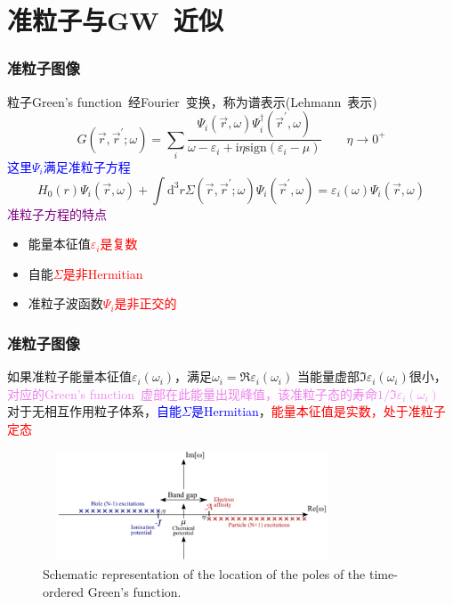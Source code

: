 \documentclass[cjk,slidestop,compress,mathserif,blue]{beamer}
\begin{document}
\section{准粒子与\rm{GW~}近似}
\frame
{
	\frametitle{准粒子图像}
	粒子\textrm{Green's function~}经\textrm{Fourier~}变换，称为谱表示(\textrm{Lehmann~}表示)
	\begin{displaymath}
		G(\vec r,\vec r^{\prime};\omega)=\sum_i\frac{\Psi_i(\vec r,\omega)\Psi_i^{\dag}(\vec r^{\prime},\omega)}{\omega-\varepsilon_i+\mathrm{i}\eta\mathrm{sign}(\varepsilon_i-\mu)}\qquad\eta\rightarrow0^{+}
	\end{displaymath}
	\textcolor{blue}{这里$\Psi_i$满足准粒子方程}
	\begin{displaymath}
		H_0(r)\Psi_i(\vec r,\omega)+\int\mathrm{d}^3r\Sigma(\vec r,\vec r^{\prime};\omega)\Psi_i(\vec r^{\prime},\omega)=\varepsilon_i(\omega)\Psi_i(\vec r,\omega)
	\end{displaymath}
	\textcolor{purple}{准粒子方程的特点}
	\begin{itemize}
		\item 能量本征值\textcolor{red}{$\varepsilon_i$是复数}
		\item 自能\textcolor{red}{$\Sigma$是非\textrm{Hermitian}}
		\item 准粒子波函数\textcolor{red}{$\Psi_i$是非正交的}
	\end{itemize}
}

\frame
{
	\frametitle{准粒子图像}
	如果准粒子能量本征值$\varepsilon_i(\omega_i)$，满足$\omega_i=\Re\varepsilon_i(\omega_i)$
	\vskip 5pt
	当能量虚部$\Im\varepsilon_i(\omega_i)$很小，\textcolor{violet}{对应的\textrm{Green's function~}虚部在此能量出现峰值，该准粒子态的寿命$1/\Im\varepsilon_i(\omega_i)$}
	\vskip 5pt
	对于无相互作用粒子体系，\textcolor{blue}{自能$\Sigma$是\textrm{Hermitian}}，\textcolor{red}{能量本征值是实数，处于准粒子定态}
\begin{figure}[h!]
\centering
\vspace*{-0.1in}
\includegraphics[height=1.3in,width=3.5in,viewport=0 0 1250 520,clip]{Figures/GW_Quasiparticle.png}
\caption{\small \textrm{Schematic representation of the location of the poles of the time-ordered Green's function.}}%
\label{GW_Quasiparticle}
\end{figure} 
}
\end{document}
